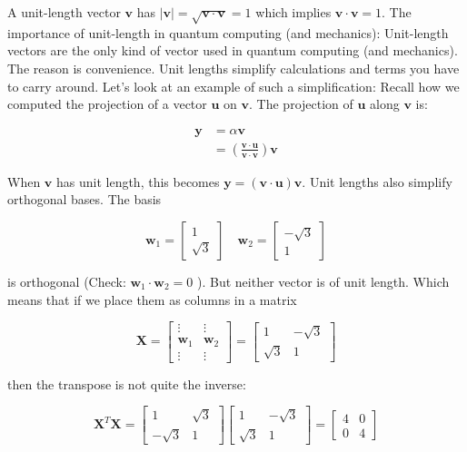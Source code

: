 \documentclass[main.tex]{subfiles}
\begin{document}
A unit-length vector $\mathbf{v}$ has $|\mathbf{v}|=\sqrt{\mathbf{v} \cdot \mathbf{v}}=1$ which implies $\mathbf{v} \cdot \mathbf{v}=1$. The importance of unit-length in quantum computing (and mechanics): Unit-length vectors are the only kind of vector used in quantum computing (and mechanics). The reason is convenience. Unit lengths simplify calculations and terms you have to carry around. Let's look at an example of such a simplification: Recall how we computed the projection of a vector $\mathbf{u}$ on $\mathbf{v}$. The projection of $\mathbf{u}$ along $\mathbf{v}$ is:

$$
\begin{aligned}
\mathbf{y} &=\alpha \mathbf{v} \\
&=\left(\frac{\mathbf{v} \cdot \mathbf{u}}{\mathbf{v} \cdot \mathbf{v}}\right) \mathbf{v}
\end{aligned}
$$

When $\mathbf{v}$ has unit length, this becomes $\mathbf{y}=(\mathbf{v} \cdot \mathbf{u}) \mathbf{v}$. Unit lengths also simplify orthogonal bases. The basis

$$
\mathbf{w}_{1}=\left[\begin{array}{r}
1 \\
\sqrt{3}
\end{array}\right] \quad \mathbf{w}_{2}=\left[\begin{array}{r}
-\sqrt{3} \\
1
\end{array}\right]
$$

is orthogonal (Check: $\mathbf{w}_{1} \cdot \mathbf{w}_{2}=0$ ). But neither vector is of unit length. Which means that if we place them as columns in a matrix

$$
\mathbf{X}=\left[\begin{array}{cc}
\vdots & \vdots \\
\mathbf{w}_{1} & \mathbf{w}_{2} \\
\vdots & \vdots
\end{array}\right]=\left[\begin{array}{cc}
1 & -\sqrt{3} \\
\sqrt{3} & 1
\end{array}\right]
$$

then the transpose is not quite the inverse:

$$
\mathbf{X}^{T} \mathbf{X}=\left[\begin{array}{cc}
1 & \sqrt{3} \\
-\sqrt{3} & 1
\end{array}\right]\left[\begin{array}{cc}
1 & -\sqrt{3} \\
\sqrt{3} & 1
\end{array}\right]=\left[\begin{array}{ll}
4 & 0 \\
0 & 4
\end{array}\right]
$$
\end{document}
